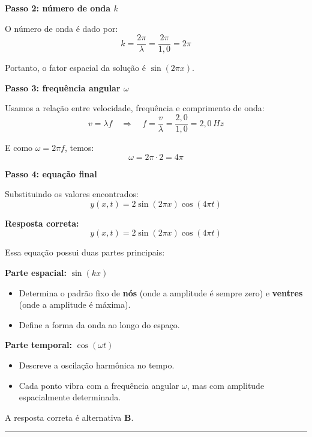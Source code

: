 \begin{flushleft}
\bigskip

\textbf{Passo 2: número de onda \(k\)}

O número de onda é dado por:
\[
k = \frac{2\pi}{\lambda} = \frac{2\pi}{1,0} = 2\pi
\]

Portanto, o fator espacial da solução é \(\sin(2\pi x)\).

\bigskip

\textbf{Passo 3: frequência angular \(\omega\)}

Usamos a relação entre velocidade, frequência e comprimento de onda:
\[
v = \lambda f \quad \Longrightarrow \quad f = \frac{v}{\lambda} = \frac{2,0}{1,0} = 2,0\,Hz
\]

E como \(\omega = 2\pi f\), temos:
\[
\omega = 2\pi \cdot 2 = 4\pi
\]

\bigskip

\textbf{Passo 4: equação final}

Substituindo os valores encontrados:
\[
y(x,t) = 2 \sin(2\pi x) \cos(4\pi t)
\]

\bigskip

\textbf{Resposta correta:}
\[
\boxed{y(x,t) = 2 \sin(2\pi x) \cos(4\pi t)}
\]

Essa equação possui duas partes principais:

\bigskip

\textbf{Parte espacial:} \(\sin(kx)\)
\begin{itemize}
    \item Determina o padrão fixo de \textbf{nós} (onde a amplitude é sempre zero) e \textbf{ventres} (onde a amplitude é máxima).
    \item Define a forma da onda ao longo do espaço.
\end{itemize}

\bigskip

\textbf{Parte temporal:} \(\cos(\omega t)\)
\begin{itemize}
    \item Descreve a oscilação harmônica no tempo.
    \item Cada ponto vibra com a frequência angular \(\omega\), mas com amplitude espacialmente determinada.
\end{itemize}


A resposta correta é alternativa \colorbox{green!50}{\textbf{B}}.
\end{flushleft}

\noindent\rule{\linewidth}{0.6pt}\\

